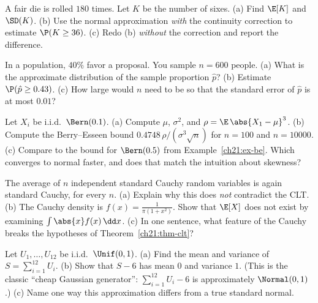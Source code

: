 \begin{exercise}
\label{ch21:ex-cc-prob}
A fair die is rolled $180$ times. Let $K$ be the number of sixes. (a) Find $\E[K]$ and
$\SD(K)$. (b) Use the normal approximation \emph{with} the continuity correction to
estimate $\P(K \ge 36)$. (c) Redo (b) \emph{without} the correction and report the
difference.
\end{exercise}

\begin{exercise}[A poll]
\label{ch21:ex-poll2}
In a population, $40\%$ favor a proposal. You sample $n = 600$ people. (a) What is the
approximate distribution of the sample proportion $\hat p$? (b) Estimate
$\P(\hat p \ge 0.43)$. (c) How large would $n$ need to be so that the standard error of
$\hat p$ is at most $0.01$?
\end{exercise}

\begin{exercise}
\label{ch21:ex-be-hand}
Let $X_i$ be i.i.d.\ $\Bern(0.1)$. (a) Compute $\mu$, $\sigma^2$, and
$\rho = \E\,\abs{X_1 - \mu}^3$. (b) Compute the Berry--Esseen bound
$0.4748\,\rho/(\sigma^3\sqrt n)$ for $n = 100$ and $n = 10000$. (c) Compare to the bound
for $\Bern(0.5)$ from Example~\ref{ch21:ex-be}. Which converges to normal faster, and
does that match the intuition about skewness?
\end{exercise}

\begin{exercise}
\label{ch21:ex-cauchy}
The average of $n$ independent standard Cauchy random variables is again standard Cauchy,
for every $n$. (a) Explain why this does \emph{not} contradict the CLT. (b) The Cauchy
density is $f(x) = \frac{1}{\pi(1+x^2)}$. Show that $\E[X]$ does not exist by examining
$\int \abs{x} f(x)\,\dd x$. (c) In one sentence, what feature of the Cauchy breaks the
hypotheses of Theorem~\ref{ch21:thm-clt}?
\end{exercise}

\begin{exercise}
\label{ch21:ex-irwin}
Let $U_1, \dots, U_{12}$ be i.i.d.\ $\Unif(0,1)$. (a) Find the mean and variance of
$S = \sum_{i=1}^{12} U_i$. (b) Show that $S - 6$ has mean $0$ and variance $1$. (This is
the classic ``cheap Gaussian generator'': $\sum_{i=1}^{12} U_i - 6$ is approximately
$\Normal(0,1)$.) (c) Name one way this approximation differs from a true standard normal.
\end{exercise}

